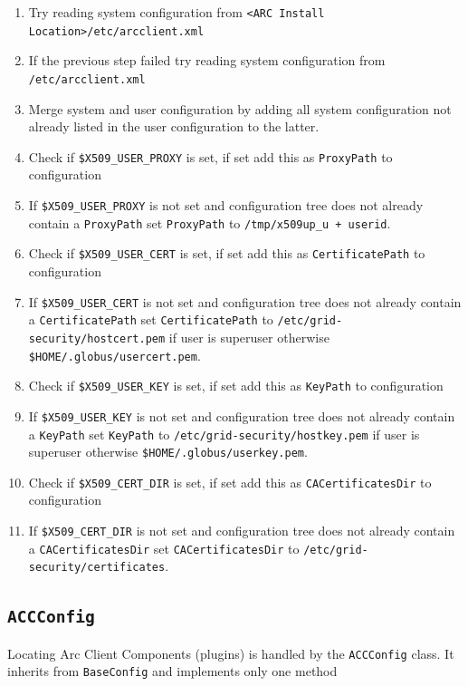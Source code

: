 \documentclass{book}
\newcommand{\ACCConfig}{\texttt{ACCConfig}}
\begin{document}
\begin{enumerate}
\item{Try reading system configuration from \texttt{<ARC Install Location>/etc/arcclient.xml}}
\item{If the previous step failed try reading system configuration from \texttt{/etc/arcclient.xml}}
\item{Merge system and user configuration by adding all system configuration not already listed 
in the user configuration to the latter.}
\item{Check if \texttt{\$X509\_USER\_PROXY} is set, if set add this as \texttt{ProxyPath} to configuration}
\item{If \texttt{\$X509\_USER\_PROXY} is not set and configuration tree does not already contain 
a \texttt{ProxyPath} set \texttt{ProxyPath} to \texttt{/tmp/x509up\_u + userid}.}
\item{Check if \texttt{\$X509\_USER\_CERT} is set, if set add this as \texttt{CertificatePath} to configuration}
\item{If \texttt{\$X509\_USER\_CERT} is not set and configuration tree does not already contain 
a \texttt{CertificatePath} set \texttt{CertificatePath} to \texttt{/etc/grid-security/hostcert.pem} 
if user is superuser otherwise 
\texttt{\$HOME/.globus/usercert.pem}.}
\item{Check if \texttt{\$X509\_USER\_KEY} is set, if set add this as \texttt{KeyPath} to configuration}
\item{If \texttt{\$X509\_USER\_KEY} is not set and configuration tree does not already contain 
a \texttt{KeyPath} set \texttt{KeyPath} to \texttt{/etc/grid-security/hostkey.pem} 
if user is superuser otherwise \texttt{\$HOME/.globus/userkey.pem}.}
\item{Check if \texttt{\$X509\_CERT\_DIR} is set, if set add this as \texttt{CACertificatesDir} to configuration}
\item{If \texttt{\$X509\_CERT\_DIR} is not set and configuration tree does not already contain 
a \texttt{CACertificatesDir} set \texttt{CACertificatesDir} to \texttt{/etc/grid-security/certificates}.}
\end{enumerate}

\subsection{{\ACCConfig}}
Locating Arc Client Components (plugins) is handled by the {\ACCConfig} class. It inherits from \texttt{BaseConfig} 
and implements only one method
\end{document}
